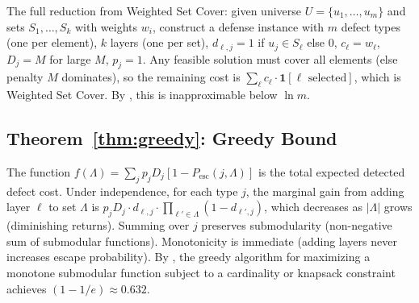 \documentclass[11pt, a4paper]{article}
\theoremstyle{definition}
\theoremstyle{remark}
\newcommand{\Pesc}{P_{\mathrm{esc}}}
\begin{document}
The full reduction from Weighted Set Cover: given universe $U = \{u_1, \ldots, u_m\}$ and sets $S_1, \ldots, S_k$ with weights $w_i$, construct a defense instance with $m$ defect types (one per element), $k$ layers (one per set), $d_{\ell,j} = 1$ if $u_j \in S_\ell$ else $0$, $c_\ell = w_\ell$, $D_j = M$ for large $M$, $p_j = 1$. Any feasible solution must cover all elements (else penalty $M$ dominates), so the remaining cost is $\sum_\ell c_\ell \cdot \mathbf{1}[\ell \text{ selected}]$, which is Weighted Set Cover. By \citet{dinur2014}, this is inapproximable below $\ln m$.

\subsection{Theorem~\ref{thm:greedy}: Greedy Bound}

The function $f(\Lambda) = \sum_j p_j D_j [1 - \Pesc(j, \Lambda)]$ is the total expected detected defect cost. Under independence, for each type $j$, the marginal gain from adding layer $\ell$ to set $\Lambda$ is $p_j D_j \cdot d_{\ell,j} \cdot \prod_{\ell' \in \Lambda}(1-d_{\ell',j})$, which decreases as $|\Lambda|$ grows (diminishing returns). Summing over $j$ preserves submodularity (non-negative sum of submodular functions). Monotonicity is immediate (adding layers never increases escape probability). By \citet{nemhauser1978}, the greedy algorithm for maximizing a monotone submodular function subject to a cardinality or knapsack constraint achieves $(1-1/e) \approx 0.632$.
\end{document}
